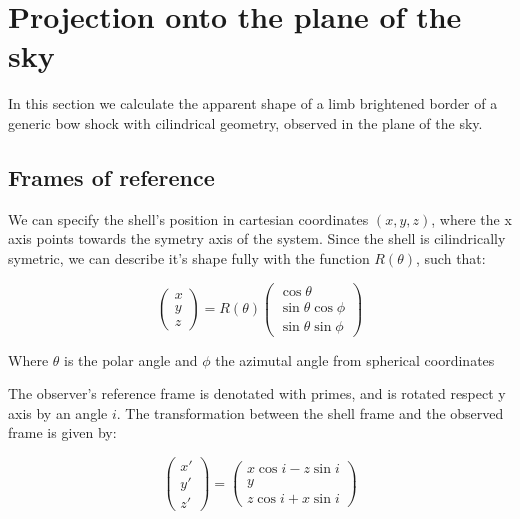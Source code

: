 \section{Projection onto the plane of the sky}
\label{sec:projection}



In this section we calculate the apparent shape of a limb brightened  border of a generic bow shock with cilindrical geometry, observed in the
plane of the sky.

\subsection{Frames of reference}

We can specify the shell's position in cartesian coordinates $(x,y,z)$, where the x axis points towards the symetry axis of the system.
Since the shell is cilindrically symetric, we can describe it's shape fully with the function $R(\theta)$, such that:

\begin{equation}
\left(\begin{array}{c}
x \\ y \\ z
\end{array}
\right) = R(\theta)\left(\begin{array}{c}
\cos\theta \\
\sin\theta\cos\phi \\
\sin\theta\sin\phi
\end{array}\right)
\end{equation} 

Where $\theta$ is the polar angle and $\phi$ the azimutal angle from spherical coordinates

The observer's reference frame is denotated with primes, and is rotated respect y axis by an angle $i$. The transformation between the shell frame and the observed
frame is given by:

\begin{equation}
\left(\begin{array}{c}
x' \\ y' \\ z'
\end{array}
\right) = \left(\begin{array}{c}
x\cos i - z\sin i\\
y \\
z\cos i + x\sin i
\end{array}\right)
\label{eq:Trans}
\end{equation} 

